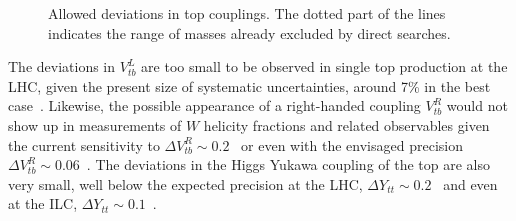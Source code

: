 \documentclass[12pt,a4paper]{article}
\begin{document}
\begin{figure}[htb]
\begin{center}
\begin{tabular}{cc}
\end{tabular}
\caption{Allowed deviations in top couplings. The dotted part of the lines indicates the range of masses already excluded by direct searches.}
\label{fig:mix}
\end{center}
\end{figure}
%
The deviations in $V_{tb}^L$ are too small to be observed in single top production at the LHC, given the present size of systematic uncertainties, around 7\% in the best case~\cite{Chatrchyan:2012ep,Aad:2012ux}. 
Likewise, the possible appearance of a right-handed coupling $V_{tb}^R$ would not show up in measurements of $W$ helicity fractions and related observables given the current sensitivity to $\Delta V_{tb}^R \sim 0.2$~\cite{Aad:2012ky} or even with the envisaged precision $\Delta V_{tb}^R \sim 0.06$~\cite{AguilarSaavedra:2007rs}.
The deviations in the Higgs Yukawa coupling of the top are also very small, well below the expected precision at the LHC, $\Delta Y_{tt}\sim 0.2$~\cite{AllwoodSpiers:2012zz} and even at the ILC, $\Delta Y_{tt}\sim 0.1$~\cite{Martinez:2002st,Yonamine:2011jg}.
\end{document}
